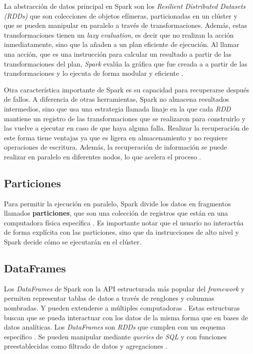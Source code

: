 La abstracción de datos principal en Spark son los \textit{Resilient Distributed Datasets (RDDs)} que son colecciones de objetos efímeras, particionadas en un clúster y que se pueden manipular en paralelo a través de transformaciones. Además, estas transformaciones tienen un \textit{lazy evaluation}, es decir que no realizan la acción inmediatamente, sino que la añaden a un plan eficiente de ejecución. Al llamar una acción, que es una instrucción para calcular un resultado a partir de las transformaciones del plan, \textit{Spark} evalúa la gráfica que fue creada a a partir de las transformaciones y lo ejecuta de forma modular y eficiente \cite{sparkberkeley}.

Otra característica importante de Spark es su capacidad para recuperarse después de fallos. A diferencia de otras herramientas, Spark no almacena resultados intermedios, sino que usa una estrategia llamada linaje en la que cada \textit{RDD} mantiene un registro de las transformaciones que se realizaron para construirlo y las vuelve a ejecutar en caso de que haya alguna falla. Realizar la recuperación de este forma tiene ventajas ya que es ligera en almacenamiento y no requiere operaciones de escritura. Además, la recuperación de información se puede realizar en paralelo en diferentes nodos, lo que acelera el proceso \cite{sparkberkeley}.

\subsection{Particiones}

Para permitir la ejecución en paralelo, Spark divide los datos en fragmentos llamados \textbf{particiones}, que son una colección de registros que están en una computadora física específica \cite{sparkguide}. Es importante notar que el usuario no interactúa de forma explícita con las particiones, sino que da instrucciones de alto nivel y Spark decide cómo se ejecutarán en el clúster.

\subsection{DataFrames}

Los \textit{DataFrames} de Spark son la API estructurada más popular del \textit{framework} y permiten representar tablas de datos a través de renglones y columnas nombradas. Y pueden extenderse a múltiples computadoras \cite{sparkguide}. Estas estructuras buscan que se pueda interactuar con los datos de la misma forma que en bases de datos analíticas. Los \textit{DataFrames} son \textit{RDDs} que cumplen con un esquema específico \cite{sparkberkeley}. Se pueden manipular mediante \textit{queries} de \textit{SQL} y con funciones preestablecidas como filtrado de datos y agregaciones \cite{sparkberkeley}.

